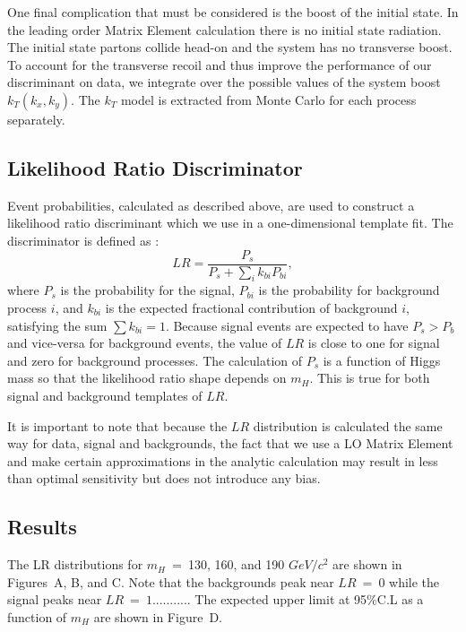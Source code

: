 
One final complication that must be considered is the boost of the initial state.
In the leading order Matrix Element calculation there is no initial state radiation. 
The initial state partons collide head-on and the system has no transverse boost. 
To account for the transverse recoil and thus improve the performance of our discriminant
on data,
we integrate over the possible values of the system boost $k_{T}(k_{x},k_{y})$. 
The $k_T$ model is extracted from Monte Carlo for each process separately.

\subsection{Likelihood Ratio Discriminator}
Event probabilities, calculated as described above, are used to construct 
a likelihood ratio discriminant which we use in a one-dimensional template fit.  
The discriminator is defined as :
\begin{equation}
\label{eqn:LR}
LR = \frac { P_s} { P_s + \sum_i k_{bi} P_{bi}},
\end{equation}
where $P_s$  is the probability for the signal, $P_{bi}$ is the probability for background
process $i$, and
$k_{bi}$ is the expected fractional contribution of background $i$,
satisfying the sum $\sum k_{bi} =1$.
Because signal events are expected to have $P_s>P_b$ and vice-versa for background events, 
the value of $LR$ is close to one for signal and zero for background processes.
The calculation of $P_s$ is a function of Higgs mass so that the likelihood ratio
shape depends on $m_H$. This is true for both signal and background templates of $LR$.

It is important to note that because the $LR$ distribution is calculated the same way for data, 
signal and backgrounds, the fact that we use a LO Matrix Element and make certain 
approximations in the analytic calculation may result in less than optimal sensitivity 
but does not introduce any bias.

\subsection{Results}
The LR distributions for $m_H$~=~130, 160, and 190 $GeV/c^2$ are shown in
Figures~A, B, and C.  Note that the backgrounds peak near $LR~=~0$ while the signal
peaks near $LR~=~1$...........
The expected upper limit at 95\%C.L as a function of $m_H$ are shown in Figure~D.
